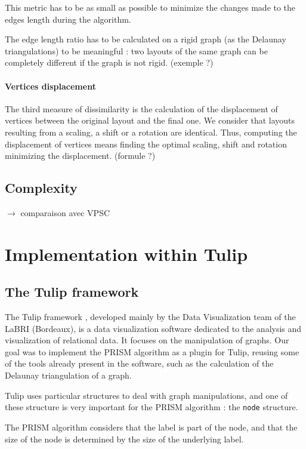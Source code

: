 \documentclass[12pt]{report}
\begin{document}
This metric has to be as small as possible to minimize the changes made to the edges length during the algorithm.

The edge length ratio has to be calculated on a rigid graph (as the Delaunay triangulations) to be meaningful : two layouts of the same graph can be completely different if the graph is not rigid. (exemple ?)

\subsubsection{Vertices displacement}

The third measure of dissimilarity is the calculation of the displacement of vertices between the original layout and the final one. We consider that layouts resulting from a scaling, a shift or a rotation are identical. Thus, computing the displacement of vertices means finding the optimal scaling, shift and rotation minimizing the displacement. (formule ?)

\section{Complexity}


$\rightarrow$ comparaison avec VPSC
\chapter{Implementation within Tulip}

\section{The Tulip framework}

The Tulip framework \cite{Auber12}, developed mainly by the Data Visualization team of the LaBRI (Bordeaux), is a data visualization software dedicated to the analysis and visualization of relational data. It focuses on the manipulation of graphs. Our goal was to implement the PRISM algorithm as a plugin for Tulip, reusing some of the tools already present in the software, such as the calculation of the Delaunay triangulation of a graph.

Tulip uses particular structures to deal with graph manipulations, and one of these structure is very important for the PRISM algorithm : the \texttt{node} structure.

The PRISM algorithm considers that the label is part of the node, and that the size of the node is determined by the size of the underlying label.
\end{document}
